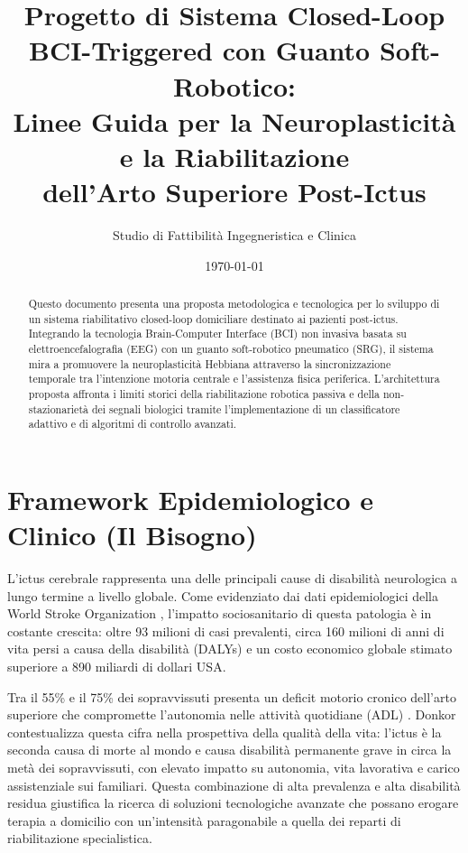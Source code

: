 \documentclass[a4paper,11pt]{article}
\title{Progetto di Sistema Closed-Loop BCI-Triggered con Guanto Soft-Robotico:\\
Linee Guida per la Neuroplasticità e la Riabilitazione\\
dell'Arto Superiore Post-Ictus}
\author{Studio di Fattibilità Ingegneristica e Clinica}
\date{\today}
\begin{document}
\maketitle

\begin{abstract}
Questo documento presenta una proposta metodologica e tecnologica per lo sviluppo di
un sistema riabilitativo closed-loop domiciliare destinato ai pazienti post-ictus.
Integrando la tecnologia Brain-Computer Interface (BCI) non invasiva basata su
elettroencefalografia (EEG) con un guanto soft-robotico pneumatico (SRG), il sistema
mira a promuovere la neuroplasticità Hebbiana attraverso la sincronizzazione temporale
tra l'intenzione motoria centrale e l'assistenza fisica periferica. L'architettura proposta
affronta i limiti storici della riabilitazione robotica passiva e della non-stazionarietà
dei segnali biologici tramite l'implementazione di un classificatore adattivo e di
algoritmi di controllo avanzati.
\end{abstract}

\newpage

\section{Framework Epidemiologico e Clinico (Il Bisogno)}
L'ictus cerebrale rappresenta una delle principali cause di disabilità neurologica
a lungo termine a livello globale. Come evidenziato dai dati epidemiologici della
World Stroke Organization \cite{feigin2025world}, l'impatto sociosanitario di questa
patologia è in costante crescita: oltre 93 milioni di casi prevalenti, circa
160 milioni di anni di vita persi a causa della disabilità (DALYs) e un costo economico
globale stimato superiore a 890 miliardi di dollari USA.

Tra il 55\% e il 75\% dei sopravvissuti presenta un deficit motorio cronico
dell'arto superiore che compromette l'autonomia nelle attività quotidiane (ADL)
\cite{proietti2024combining}. Donkor \cite{donkor2018stroke} contestualizza questa
cifra nella prospettiva della qualità della vita: l'ictus è la seconda causa di morte
al mondo e causa disabilità permanente grave in circa la metà dei sopravvissuti,
con elevato impatto su autonomia, vita lavorativa e carico assistenziale sui familiari.
Questa combinazione di alta prevalenza e alta disabilità residua giustifica la ricerca
di soluzioni tecnologiche avanzate che possano erogare terapia a domicilio con
un'intensità paragonabile a quella dei reparti di riabilitazione specialistica.
\end{document}
